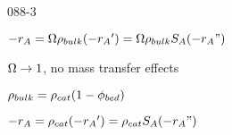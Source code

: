 \begin{mitframe}{088-3}

\begin{listone}
	\item $-\pos_{\helmholtz}=\mpc\dens_{bulk}(-{\pos_{\helmholtz}}')=\mpc\dens_{bulk}\entropy_{\helmholtz}(-{\pos_{\helmholtz}}")$
    
    \begin{listtwo}
    	\item $\mpc\rightarrow{1}$, no mass transfer effects
        \item $\dens_{bulk}=\dens_{cat}(1-\eleccoeff_{bed})$
        \item $-\pos_{\helmholtz}=\dens_{cat}(-{\pos_{\helmholtz}}')=\dens_{cat}\entropy_{\helmholtz}(-{\pos_{\helmholtz}}")$    
    \end{listtwo}
\end{listone}        
\end{mitframe}